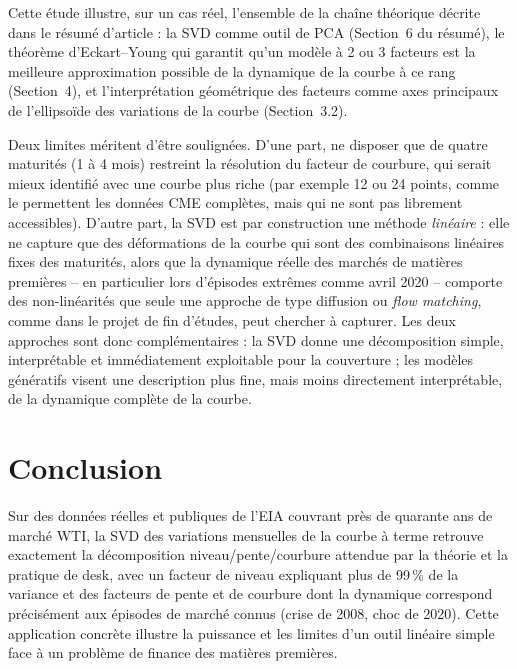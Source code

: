 \documentclass[11pt,a4paper]{article}
\begin{document}
Cette étude illustre, sur un cas réel, l'ensemble de la chaîne théorique décrite dans le résumé d'article : la SVD comme outil de PCA (Section~6 du résumé), le théorème d'Eckart--Young qui garantit qu'un modèle à 2 ou 3 facteurs est la meilleure approximation possible de la dynamique de la courbe à ce rang (Section~4), et l'interprétation géométrique des facteurs comme axes principaux de l'ellipsoïde des variations de la courbe (Section~3.2).

Deux limites méritent d'être soulignées. D'une part, ne disposer que de quatre maturités (1 à 4 mois) restreint la résolution du facteur de courbure, qui serait mieux identifié avec une courbe plus riche (par exemple 12 ou 24 points, comme le permettent les données CME complètes, mais qui ne sont pas librement accessibles). D'autre part, la SVD est par construction une méthode \emph{linéaire} : elle ne capture que des déformations de la courbe qui sont des combinaisons linéaires fixes des maturités, alors que la dynamique réelle des marchés de matières premières -- en particulier lors d'épisodes extrêmes comme avril 2020 -- comporte des non-linéarités que seule une approche de type diffusion ou \emph{flow matching}, comme dans le projet de fin d'études, peut chercher à capturer. Les deux approches sont donc complémentaires : la SVD donne une décomposition simple, interprétable et immédiatement exploitable pour la couverture ; les modèles génératifs visent une description plus fine, mais moins directement interprétable, de la dynamique complète de la courbe.

\section{Conclusion}

Sur des données réelles et publiques de l'EIA couvrant près de quarante ans de marché WTI, la SVD des variations mensuelles de la courbe à terme retrouve exactement la décomposition niveau/pente/courbure attendue par la théorie et la pratique de desk, avec un facteur de niveau expliquant plus de 99\,\% de la variance et des facteurs de pente et de courbure dont la dynamique correspond précisément aux épisodes de marché connus (crise de 2008, choc de 2020). Cette application concrète illustre la puissance et les limites d'un outil linéaire simple face à un problème de finance des matières premières.
\end{document}
